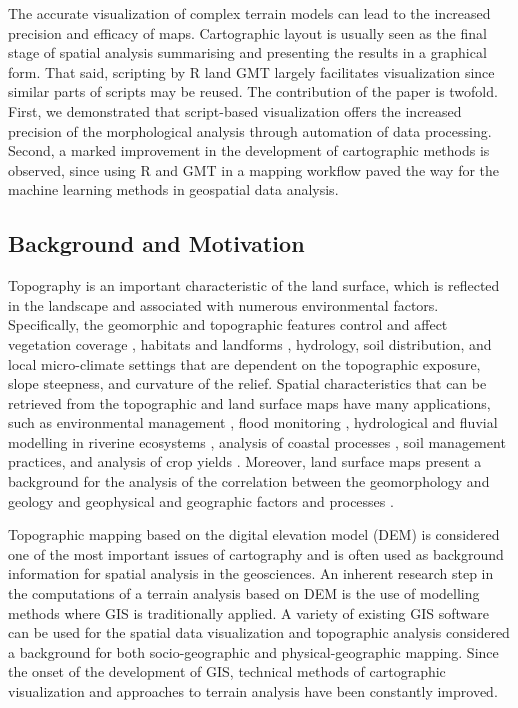 \documentclass[land,article,accept,pdftex,moreauthors]{Definitions/mdpi}
\begin{document}
The accurate visualization of complex terrain models can lead to the increased precision and efficacy of maps. Cartographic layout is usually seen as the final stage of spatial analysis summarising and presenting the results in a graphical form. That said, scripting by R land GMT largely facilitates visualization since similar parts of scripts may be reused. The contribution of the paper is twofold. First, we demonstrated that script-based visualization offers the increased precision of the morphological analysis through automation of data processing. Second, a marked improvement in the development of cartographic methods is observed, since using R and GMT in a mapping workflow paved the way for the machine learning methods in geospatial data analysis.

\subsection{Background and Motivation}
Topography is an important characteristic of the land surface, which is reflected in the landscape and associated with numerous environmental factors. Specifically, the geomorphic and topographic features control and affect vegetation coverage \cite{land10060559,GOMEZ201511}, habitats and landforms \cite{land7030102,land10101031}, hydrology, soil distribution, and local micro-climate settings that are dependent on the topographic exposure, slope steepness, and curvature of the relief. Spatial characteristics that can be retrieved from the topographic and land surface maps have many applications, such as environmental management  \cite{land6040083}, flood monitoring \cite{HOOKE2020106793}, hydrological and fluvial modelling in riverine ecosystems \cite{SIAKEU2004231,NAKAYAMA201362}, analysis of coastal processes \cite{ITO2022102527}, soil management practices, and analysis of crop yields \cite{TABUCHI20174,PRIYA2001113,SASAI2012175}. Moreover, land surface maps present a background for the analysis of the correlation between the geomorphology and geology \cite{MATSUURA20141} and geophysical and geographic factors and processes \cite{IMAIZUMI2018125}.  %

Topographic mapping based on the digital elevation model (DEM) is considered one of the most important issues of cartography and is often used as background information for spatial analysis in the geosciences. An inherent research step in the computations of a terrain analysis based on DEM is the use of modelling methods where GIS is traditionally applied. A variety of existing GIS software can be used for the spatial data visualization and topographic analysis considered a background for both socio-geographic and physical-geographic mapping. Since the onset of the development of GIS, technical methods of cartographic visualization and approaches to terrain analysis have been constantly improved.
\end{document}
